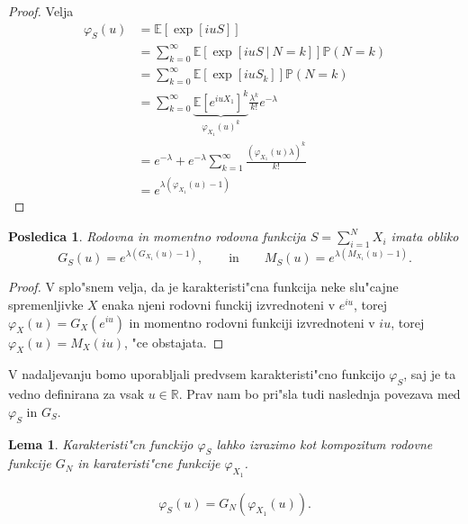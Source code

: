 \documentclass[12pt, a4paper, reqno]{amsart}
\theoremstyle{definition}
\theoremstyle{plain}
\newtheorem{lema}[definicija]{Lema}
\newtheorem{posledica}[definicija]{Posledica}
\newcommand{\R}{\mathbb{R}}
\newcommand{\E}{\mathbb{E}}
\newcommand{\Prob}{\mathbb{P}}
\newcommand{\1}{\mathds{1}}
\begin{document}
    \begin{proof}
        Velja
        \begin{align}
            \varphi_{S}(u) 
                    &= \E\left[\exp\left[iuS\right]\right] \nonumber\\
                    &= \sum_{k=0}^{\infty}
                        \E\left[\exp\left[iuS \ \big| \ N=k\right]\right]\Prob\left(N = k\right) \nonumber \\ 
                    &= \sum_{k=0}^{\infty}
                        \E\left[\exp\left[iuS_k\right]\right]\Prob\left(N = k\right) \nonumber \\
                    &= \sum_{k=0}^{\infty}
                        \underbrace{\E\left[e^{iuX_1}\right]^k}_{\varphi_{X_1}(u)^k}\frac{\lambda^k}{k!}e^{-\lambda } \label{eq:MomentS}\\ 
                    &= e^{-\lambda } + e^{-\lambda }\sum_{k=1}^\infty\frac{\left(\varphi_{X_1}(u)\lambda \right)^k}{k!} \nonumber \\
                    &= e^{\lambda \left(\varphi_{X_1}(u) - 1\right)} \nonumber
        \end{align}
    \end{proof}
    
    \begin{posledica}
        Rodovna in momentno rodovna funkcija $S=\sum_{i = 1}^{N}X_i$ imata obliko 
    \begin{equation*}
        G_{S}(u) = e^{\lambda \left(G_{X_1}(u) - 1\right)}, \qquad \text{in} \qquad
        M_{S}(u) = e^{\lambda \left(M_{X_1}(u) - 1\right)}.
    \end{equation*}
    \end{posledica}

    \begin{proof}
    V splo"snem velja, da je karakteristi"cna funkcija neke slu"cajne spremenljivke $X$ enaka
    njeni rodovni funckij izvrednoteni v $e^{iu}$, torej $\varphi_X(u) = G_X(e^{iu})$ in momentno rodovni 
    funkciji izvrednoteni v $iu$, torej $\varphi_X(u) = M_X(iu)$, "ce obstajata.
    \end{proof}

    V nadaljevanju bomo uporabljali predvsem karakteristi"cno funkcijo $\varphi_S$, saj je ta vedno definirana 
    za vsak $u\in\R$. Prav nam bo pri"sla tudi naslednja povezava med $\varphi_S$ in $G_S$. 

    \begin{lema}
        Karakteristi"cn funckijo $\varphi_S$ lahko izrazimo kot kompozitum rodovne funkcije $G_N$ in 
        karateristi"cne funkcije $\varphi_{X_1}$.

        \begin{align*}
            \varphi_{S}(u) = G_{N}\left(\varphi_{X_1}(u)\right).
        \end{align*}

        \label{lema:povezavaRodovneKarkateristicne}
    \end{lema}
\end{document}
